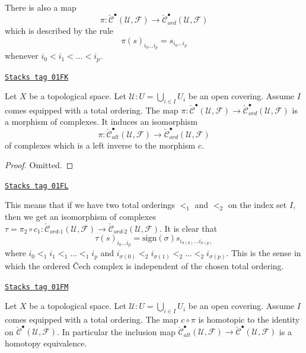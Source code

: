 There is also a map
$$
\pi :
\check{\mathcal{C}}^\bullet(\mathcal{U}, \mathcal{F})
\longrightarrow
\check{\mathcal{C}}_{ord}^\bullet(\mathcal{U}, \mathcal{F})
$$
which is described by the rule
$$
\pi(s)_{i_0\ldots i_p} = s_{i_0\ldots i_p}
$$
whenever $i_0 < i_1 < \ldots < i_p$.

\begin{lemma}
\label{cohomology-lemma-project-to-ordered}
\href{https://stacks.math.columbia.edu/tag/01FK}{\texttt{Stacks tag 01FK}}

Let $X$ be a topological space.
Let $\mathcal{U} : U = \bigcup_{i \in I} U_i$ be an open covering.
Assume $I$ comes equipped with a total ordering.
The map $\pi : \check{\mathcal{C}}^\bullet(\mathcal{U}, \mathcal{F})
\to \check{\mathcal{C}}_{ord}^\bullet(\mathcal{U}, \mathcal{F})$
is a morphism of complexes. It induces an isomorphism
$$
\pi : \check{\mathcal{C}}_{alt}^\bullet(\mathcal{U}, \mathcal{F})
\to \check{\mathcal{C}}_{ord}^\bullet(\mathcal{U}, \mathcal{F})
$$
of complexes which is a left inverse to the morphism $c$.
\end{lemma}

\begin{proof}
Omitted.
\end{proof}

\begin{remark}
\label{cohomology-remark-compared-ordered-complexes}
\href{https://stacks.math.columbia.edu/tag/01FL}{\texttt{Stacks tag 01FL}}

This means that if we have two total orderings $<_1$ and $<_2$ on
the index set $I$, then we get an isomorphism of complexes
$\tau = \pi_2 \circ c_1 :
\check{\mathcal{C}}_{ord\text{-}1}(\mathcal{U}, \mathcal{F}) \to
\check{\mathcal{C}}_{ord\text{-}2}(\mathcal{U}, \mathcal{F})$.
It is clear that
$$
\tau(s)_{i_0 \ldots i_p} =
\text{sign}(\sigma) s_{i_{\sigma(0)} \ldots i_{\sigma(p)}}
$$
where $i_0 <_1 i_1 <_1 \ldots <_1 i_p$ and
$i_{\sigma(0)} <_2 i_{\sigma(1)} <_2 \ldots <_2 i_{\sigma(p)}$.
This is the sense in which the ordered {\v C}ech complex is independent
of the chosen total ordering.
\end{remark}

\begin{lemma}
\label{cohomology-lemma-alternating-usual}
\href{https://stacks.math.columbia.edu/tag/01FM}{\texttt{Stacks tag 01FM}}

Let $X$ be a topological space.
Let $\mathcal{U} : U = \bigcup_{i \in I} U_i$ be an open covering.
Assume $I$ comes equipped with a total ordering.
The map $c \circ \pi$ is homotopic to the identity on
$\check{\mathcal{C}}^\bullet(\mathcal{U}, \mathcal{F})$.
In particular the inclusion map
$\check{\mathcal{C}}_{alt}^\bullet(\mathcal{U}, \mathcal{F}) \to
\check{\mathcal{C}}^\bullet(\mathcal{U}, \mathcal{F})$
is a homotopy equivalence.
\end{lemma}

